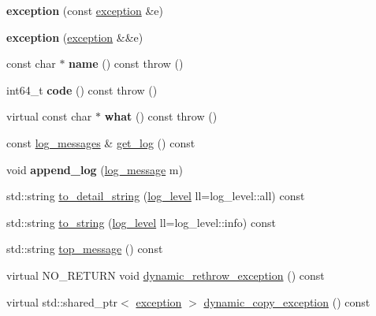 \begin{DoxyCompactItemize}
{\bfseries exception} (const \mbox{\hyperlink{classfc_1_1exception}{exception}} \&e)
\item 
\mbox{\label{classfc_1_1exception_acb133b17f42ee76692b472e887373720}} 
{\bfseries exception} (\mbox{\hyperlink{classfc_1_1exception}{exception}} \&\&e)
\item 
\mbox{\label{classfc_1_1exception_aa5734af6ae6e44c7c8a9b3c4ea8131e1}} 
const char $\ast$ {\bfseries name} () const  throw ()
\item 
\mbox{\label{classfc_1_1exception_a79a36225cde10dcd23057bbe19d3390f}} 
int64\+\_\+t {\bfseries code} () const  throw ()
\item 
\mbox{\label{classfc_1_1exception_a6c67d14894efbcab7650e8213f0a1e71}} 
virtual const char $\ast$ {\bfseries what} () const  throw ()
\item 
const \mbox{\hyperlink{classstd_1_1vector}{log\+\_\+messages}} \& \mbox{\hyperlink{classfc_1_1exception_a70b72c1e4fe0d17485a8b7a0a6f397de}{get\+\_\+log}} () const
\item 
\mbox{\label{classfc_1_1exception_a685fab238fa9b86dcf64b35417eb63b2}} 
void {\bfseries append\+\_\+log} (\mbox{\hyperlink{classfc_1_1log__message}{log\+\_\+message}} m)
\item 
std\+::string \mbox{\hyperlink{classfc_1_1exception_a7611ea8fbe25dde56649b685c2298a37}{to\+\_\+detail\+\_\+string}} (\mbox{\hyperlink{classfc_1_1log__level}{log\+\_\+level}} ll=log\+\_\+level\+::all) const
\item 
std\+::string \mbox{\hyperlink{classfc_1_1exception_adbc4557b14bc29b74e9cf9f0ed5fb8d8}{to\+\_\+string}} (\mbox{\hyperlink{classfc_1_1log__level}{log\+\_\+level}} ll=log\+\_\+level\+::info) const
\item 
std\+::string \mbox{\hyperlink{classfc_1_1exception_aeea900db85f79e5b4be0710a9df373db}{top\+\_\+message}} () const
\item 
virtual N\+O\+\_\+\+R\+E\+T\+U\+RN void \mbox{\hyperlink{classfc_1_1exception_ace951e3b4efa51ea203b0e111f7e99a2}{dynamic\+\_\+rethrow\+\_\+exception}} () const
\item 
virtual std\+::shared\+\_\+ptr$<$ \mbox{\hyperlink{classfc_1_1exception}{exception}} $>$ \mbox{\hyperlink{classfc_1_1exception_a38ac38d910ba13a339ce5855a51c9127}{dynamic\+\_\+copy\+\_\+exception}} () const

\end{DoxyCompactItemize}
